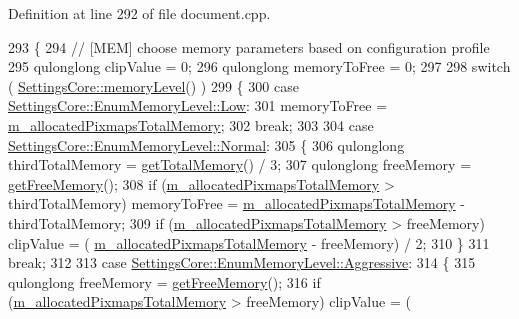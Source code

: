 Definition at line 292 of file document.\+cpp.


\begin{DoxyCode}
293 \{
294     \textcolor{comment}{// [MEM] choose memory parameters based on configuration profile}
295     qulonglong clipValue = 0;
296     qulonglong memoryToFree = 0;
297 
298     \textcolor{keywordflow}{switch} ( \hyperlink{classOkular_1_1SettingsCore_a07d75a8b7db6da9213663287a87e3226}{SettingsCore::memoryLevel}() )
299     \{
300         \textcolor{keywordflow}{case} \hyperlink{classOkular_1_1SettingsCore_1_1EnumMemoryLevel_a6dcad4c36c335a5cab78f24dd88090b4aa61e4f07eed0bf070a41fb0998e8c3b5}{SettingsCore::EnumMemoryLevel::Low}:
301             memoryToFree = \hyperlink{classOkular_1_1DocumentPrivate_accbd72ead7fca72852b516f580d2abf1}{m\_allocatedPixmapsTotalMemory};
302             \textcolor{keywordflow}{break};
303 
304         \textcolor{keywordflow}{case} \hyperlink{classOkular_1_1SettingsCore_1_1EnumMemoryLevel_a6dcad4c36c335a5cab78f24dd88090b4aab69bfc6de34e8bf9634a7586486296a}{SettingsCore::EnumMemoryLevel::Normal}:
305         \{
306             qulonglong thirdTotalMemory = \hyperlink{classOkular_1_1DocumentPrivate_a612b0f725408b5949bb5856d18e62ba8}{getTotalMemory}() / 3;
307             qulonglong freeMemory = \hyperlink{classOkular_1_1DocumentPrivate_a2657e5871ed6792f7061f29fb14b54bf}{getFreeMemory}();
308             \textcolor{keywordflow}{if} (\hyperlink{classOkular_1_1DocumentPrivate_accbd72ead7fca72852b516f580d2abf1}{m\_allocatedPixmapsTotalMemory} > thirdTotalMemory) memoryToFree
       = \hyperlink{classOkular_1_1DocumentPrivate_accbd72ead7fca72852b516f580d2abf1}{m\_allocatedPixmapsTotalMemory} - thirdTotalMemory;
309             \textcolor{keywordflow}{if} (\hyperlink{classOkular_1_1DocumentPrivate_accbd72ead7fca72852b516f580d2abf1}{m\_allocatedPixmapsTotalMemory} > freeMemory) clipValue = (
      \hyperlink{classOkular_1_1DocumentPrivate_accbd72ead7fca72852b516f580d2abf1}{m\_allocatedPixmapsTotalMemory} - freeMemory) / 2;
310         \}
311         \textcolor{keywordflow}{break};
312 
313         \textcolor{keywordflow}{case} \hyperlink{classOkular_1_1SettingsCore_1_1EnumMemoryLevel_a6dcad4c36c335a5cab78f24dd88090b4a5f4aefbf160a235d1c3219eeca91f898}{SettingsCore::EnumMemoryLevel::Aggressive}:
314         \{
315             qulonglong freeMemory = \hyperlink{classOkular_1_1DocumentPrivate_a2657e5871ed6792f7061f29fb14b54bf}{getFreeMemory}();
316             \textcolor{keywordflow}{if} (\hyperlink{classOkular_1_1DocumentPrivate_accbd72ead7fca72852b516f580d2abf1}{m\_allocatedPixmapsTotalMemory} > freeMemory) clipValue = (

\end{DoxyCode}
